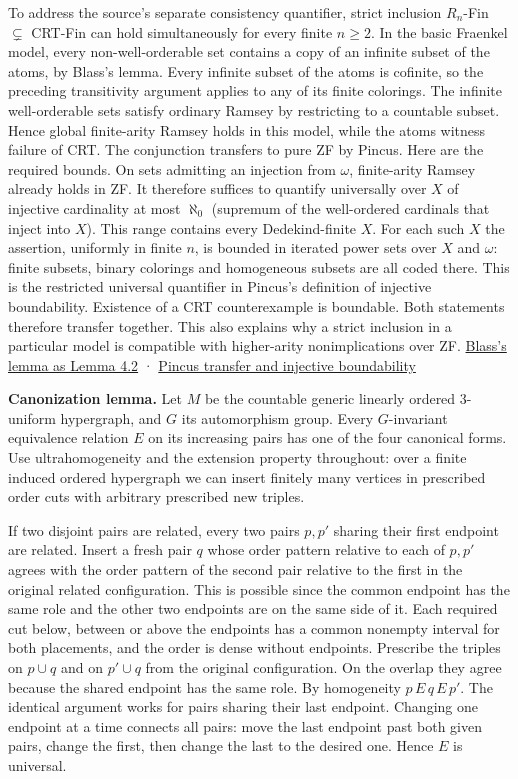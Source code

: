 \documentclass[11pt]{article}
\begin{document}
To address the source's separate consistency quantifier, strict inclusion \(R_n\)-Fin \(\subsetneq\) CRT-Fin can hold simultaneously for every finite \(n\ge2\). In the basic Fraenkel model, every non-well-orderable set contains a copy of an infinite subset of the atoms, by Blass's lemma. Every infinite subset of the atoms is cofinite, so the preceding transitivity argument applies to any of its finite colorings. The infinite well-orderable sets satisfy ordinary Ramsey by restricting to a countable subset. Hence global finite-arity Ramsey holds in this model, while the atoms witness failure of CRT. The conjunction transfers to pure ZF by Pincus. Here are the required bounds. On sets admitting an injection from \(\omega\), finite-arity Ramsey already holds in ZF. It therefore suffices to quantify universally over \(X\) of injective cardinality at most \(\aleph_0\) (supremum of the well-ordered cardinals that inject into \(X\)). This range contains every Dedekind-finite \(X\). For each such \(X\) the assertion, uniformly in finite \(n\), is bounded in iterated power sets over \(X\) and \(\omega\): finite subsets, binary colorings and homogeneous subsets are all coded there. This is the restricted universal quantifier in Pincus's definition of injective boundability. Existence of a CRT counterexample is boundable. Both statements therefore transfer together. This also explains why a strict inclusion in a particular model is compatible with higher-arity nonimplications over ZF. \href{https://arxiv.org/abs/2401.02215}{Blass's lemma as Lemma 4.2} · \href{https://doi.org/10.1007/s00605-021-01582-0}{Pincus transfer and injective boundability}

\textbf{Canonization lemma.} Let \(M\) be the countable generic linearly ordered \(3\)-uniform hypergraph, and \(G\) its automorphism group. Every \(G\)-invariant equivalence relation \(E\) on its increasing pairs has one of the four canonical forms. Use ultrahomogeneity and the extension property throughout: over a finite induced ordered hypergraph we can insert finitely many vertices in prescribed order cuts with arbitrary prescribed new triples.

If two disjoint pairs are related, every two pairs \(p,p'\) sharing their first endpoint are related. Insert a fresh pair \(q\) whose order pattern relative to each of \(p,p'\) agrees with the order pattern of the second pair relative to the first in the original related configuration. This is possible since the common endpoint has the same role and the other two endpoints are on the same side of it. Each required cut below, between or above the endpoints has a common nonempty interval for both placements, and the order is dense without endpoints. Prescribe the triples on \(p\cup q\) and on \(p'\cup q\) from the original configuration. On the overlap they agree because the shared endpoint has the same role. By homogeneity \(p\,E\,q\,E\,p'\). The identical argument works for pairs sharing their last endpoint. Changing one endpoint at a time connects all pairs: move the last endpoint past both given pairs, change the first, then change the last to the desired one. Hence \(E\) is universal.
\end{document}
